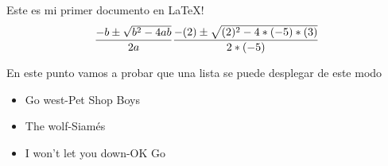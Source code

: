 \documentclass{article}
\begin{document}
  Este es mi primer documento en \LaTeX!
  \[
    \frac{-b \pm \sqrt{b^2 -4ab}}{2a} \\
    \frac{-(2) \pm \sqrt{(2)^2 -4*(-5)*(3)}}{2*(-5)}
  \]

  En este punto vamos a probar que una lista se puede desplegar de este modo
  \begin{itemize}
    \item Go west-Pet Shop Boys
    \item The wolf-Siam\'es
    \item I won't let you down-OK Go
  \end{itemize}
\end{document}
